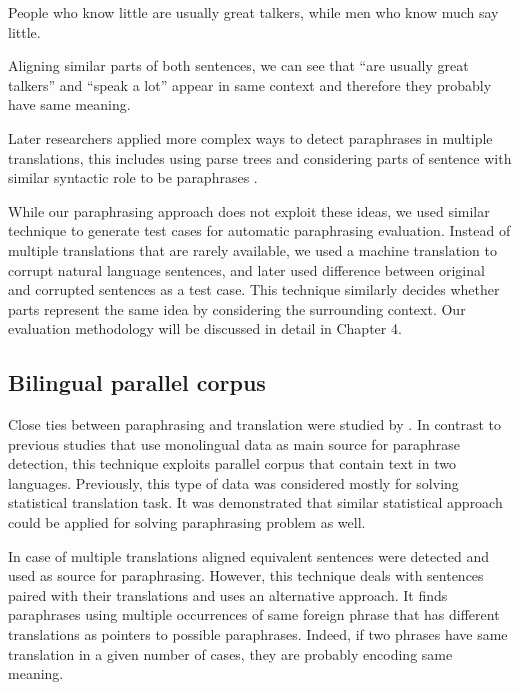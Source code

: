 \begin{center}
\begin{Large}
People who know little are usually great talkers, while men who know much say little.
\end{Large}
\end{center}

Aligning similar parts of both sentences, we can see that ``are usually great talkers'' and ``speak a lot'' appear in same context and therefore they probably have same meaning.

Later researchers applied more complex ways to detect paraphrases in multiple translations, this includes using parse trees and considering parts of sentence with similar syntactic role to be paraphrases \citep{pang2003syntax}.

While our paraphrasing approach does not exploit these ideas, we used similar technique to generate test cases for automatic paraphrasing evaluation. Instead of multiple translations that are rarely available, we used a machine translation to corrupt natural language sentences, and later used difference between original and corrupted sentences as a test case. This technique similarly decides whether parts represent the same idea by considering the surrounding context. Our evaluation methodology will be discussed in detail in Chapter 4.

\subsection{Bilingual parallel corpus}

Close ties between paraphrasing and translation were studied by \cite{Callison-Burch2007}. In contrast to previous studies that use monolingual data as main source for paraphrase detection, this technique exploits parallel corpus that contain text in two languages. Previously, this type of data was considered mostly for solving statistical translation task. It was demonstrated that similar statistical approach could be applied for solving paraphrasing problem as well.

In case of multiple translations aligned equivalent sentences were detected and used as source for paraphrasing. However, this technique deals with sentences paired with their translations and uses an alternative approach. It finds paraphrases using multiple occurrences of same foreign phrase that has different translations as pointers to possible paraphrases. Indeed, if two phrases have same translation in a given number of cases, they are probably encoding same meaning.

